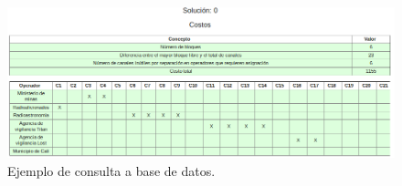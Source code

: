 \begin{figure}[H]
	\centering
	\includegraphics[width=15cm]{Capitulo8InterfacesWeb/Imagenes/Costos.png}
	\caption{Ejemplo de consulta a base de datos.}
	\label{fig:infoSolucion}	
\end{figure}



